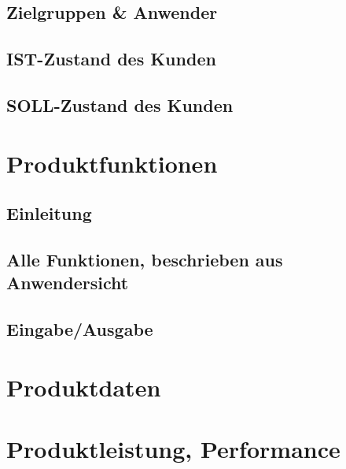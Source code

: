 \documentclass{article}
\begin{document}
        \subsection{Zielgruppen \& Anwender}
        
        \subsection{IST-Zustand des Kunden}
        
        \clearpage
        \subsection{SOLL-Zustand des Kunden}
        
    \clearpage

    \section{Produktfunktionen}\label{sec:funktionen}
        \subsection{Einleitung}\label{subsec:funktionenEinleitung}
        
        \subsection{Alle Funktionen, beschrieben aus Anwendersicht}\label{subsec:alleFunktionen}
        
        \subsection{Eingabe/Ausgabe}\label{subsec:EinAusgabe}
        
    \clearpage

    \section{Produktdaten}\label{sec:produktdaten}
        
    \clearpage

    \section{Produktleistung, Performance}\label{sec:performance}
         
    \clearpage
\end{document}
